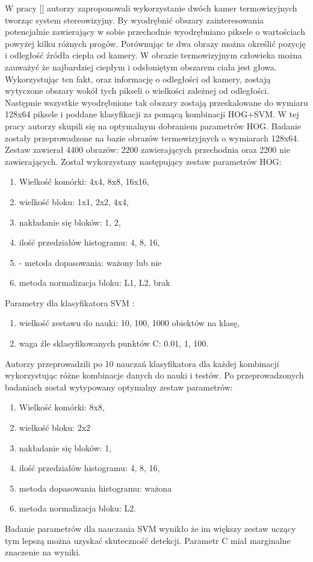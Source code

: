 W pracy [] autorzy zaproponowali wykorzystanie dwóch kamer termowizyjnych tworząc system stereowizyjny. By wyodrębnić obszary zainteresowania potencjalnie zawierający w sobie przechodnie wyodrębniano piksele o wartościach powyżej kilku różnych progów. Porównując te dwa obrazy można określić pozycję i odległość źródła ciepła od kamery. W obrazie termowizyjnym człowieka można zauważyć że najbardziej ciepłym i odsłoniętym obszarem ciała jest głowa. Wykorzystując ten fakt, oraz informację o odległości od kamery, zostają wytyczone obszary wokół tych pikseli o wielkości zależnej od odległości. Następnie wszystkie wyodrębnione tak obszary zostają przeskalowane do wymiaru 128x64 piksele i poddane klasyfikacji za pomącą kombinacji HOG+SVM. 
W tej pracy autorzy skupili się na optymalnym dobraniem parametrów HOG. Badanie zostały przeprowadzone na bazie obrazów termowizyjnych o wymiarach 128x64. Zestaw zawierał 4400 obrazów: 2200 zawierających przechodnia oraz 2200 nie zawierających. Został wykorzystany następujący zestaw parametrów HOG:
\begin{enumerate}

\item Wielkość komórki:  4x4, 8x8, 16x16,
\item wielkość bloku: 1x1, 2x2, 4x4,
\item nakładanie się bloków: 1, 2,
\item ilość przedziałów histogramu: 4, 8, 16,
\item- metoda dopasowania: ważony lub nie
\item metoda normalizacja bloku: L1, L2, brak
\end{enumerate}
Parametry dla klasyfikatora SVM :
\begin{enumerate}
\item wielkość zestawu do nauki: 10, 100, 1000 obiektów na klasę,
\item waga źle sklasyfikowanych punktów C: 0.01, 1, 100.
\end{enumerate}
Autorzy przeprowadzili po 10 nauczań klasyfikatora dla każdej kombinacji wykorzystując różne kombinacje danych do nauki i testów. Po przeprowadzonych badaniach został wytypowany optymalny zestaw parametrów:
\begin{enumerate}
\item Wielkość komórki: 8x8, 
\item wielkość bloku: 2x2
\item nakładanie się bloków: 1,
\item ilość przedziałów histogramu: 4, 8, 16,
\item metoda dopasowania histogramu: ważona 
\item metoda normalizacja bloku: L2.
\end{enumerate}
Badanie parametrów dla nauczania SVM wynikło że im większy zestaw uczący tym lepszą można uzyskać skuteczność detekcji. Parametr C miał marginalne znaczenie na wyniki.



